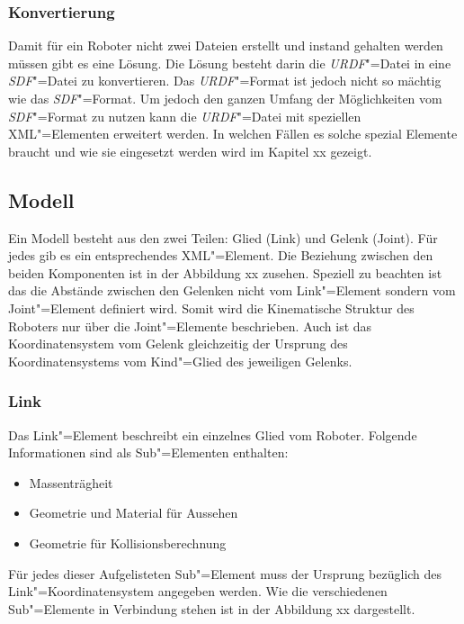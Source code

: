 \subsubsection{Konvertierung}
Damit für ein Roboter nicht zwei Dateien erstellt und instand gehalten werden müssen gibt es eine Lösung.
Die Lösung besteht darin die \textit{URDF}"=Datei in eine \textit{SDF}"=Datei zu konvertieren.
Das \textit{URDF}"=Format ist jedoch nicht so mächtig wie das \textit{SDF}"=Format.
Um jedoch den ganzen Umfang der Möglichkeiten vom \textit{SDF}"=Format zu nutzen kann die \textit{URDF}"=Datei mit speziellen XML"=Elementen erweitert werden.
In welchen Fällen es solche spezial Elemente braucht und wie sie eingesetzt werden wird im Kapitel xx gezeigt. %


\subsection{Modell}
Ein Modell besteht aus den zwei Teilen: Glied (Link) und Gelenk (Joint).
Für jedes gib es ein entsprechendes XML"=Element.
Die Beziehung zwischen den beiden Komponenten ist in der Abbildung xx zusehen. %
Speziell zu beachten ist das die Abstände zwischen den Gelenken nicht vom Link"=Element sondern vom Joint"=Element definiert wird.
Somit wird die Kinematische Struktur des Roboters nur über die Joint"=Elemente beschrieben.
Auch ist das Koordinatensystem vom Gelenk gleichzeitig der Ursprung des Koordinatensystems vom Kind"=Glied des jeweiligen Gelenks. 



\subsubsection*{Link}
Das Link"=Element beschreibt ein einzelnes Glied vom Roboter.
Folgende Informationen sind als Sub"=Elementen enthalten: 
\begin{itemize}
\item Massenträgheit
\item Geometrie und Material für Aussehen
\item Geometrie für Kollisionsberechnung
\end{itemize}
Für jedes dieser Aufgelisteten Sub"=Element muss der Ursprung bezüglich des Link"=Koordinatensystem angegeben werden.
Wie die verschiedenen Sub"=Elemente in Verbindung stehen ist in der Abbildung xx dargestellt. %

